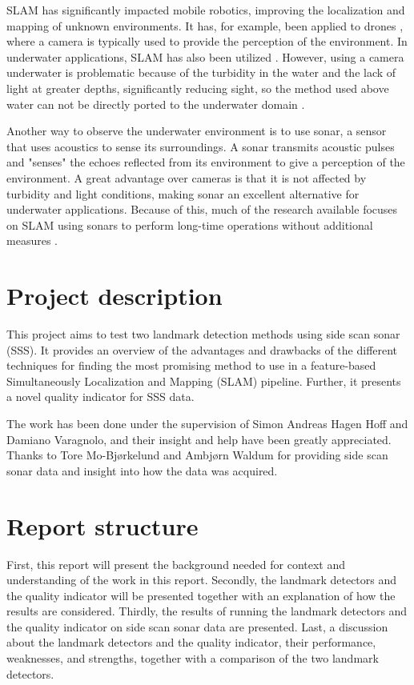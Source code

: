 SLAM has significantly impacted mobile robotics, improving the localization and mapping of unknown environments. It has, for example, been applied to drones \cite{VonStumberg2017FromExploration}, where a camera is typically used to provide the perception of the environment. In underwater applications, SLAM has also been utilized \cite{Hidalgo2015ReviewTechniques}. However, using a camera underwater is problematic because of the turbidity in the water and the lack of light at greater depths, significantly reducing sight, so the method used above water can not be directly ported to the underwater domain \cite{Paull2015Communication-constrainedSLAM}.  

Another way to observe the underwater environment is to use sonar, a sensor that uses acoustics to sense its surroundings. A sonar transmits acoustic pulses and "senses" the echoes reflected from its environment to give a perception of the environment. A great advantage over cameras is that it is not affected by turbidity and light conditions, making sonar an excellent alternative for underwater applications. Because of this, much of the research available focuses on SLAM using sonars to perform long-time operations without additional measures \cite{Hidalgo2015ReviewTechniques}.

\section{Project description}

This project aims to test two landmark detection methods using side scan sonar (SSS). It provides an overview of the advantages and drawbacks of the different techniques for finding the most promising method to use in a feature-based Simultaneously Localization and Mapping (SLAM) pipeline. Further, it presents a novel quality indicator for SSS data.

The work has been done under the supervision of Simon Andreas Hagen Hoff and Damiano Varagnolo, and their insight and help have been greatly appreciated. Thanks to Tore Mo-Bjørkelund and Ambjørn Waldum for providing side scan sonar data and insight into how the data was acquired. 

\section{Report structure}

First, this report will present the background needed for context and understanding of the work in this report. Secondly, the landmark detectors and the quality indicator will be presented together with an explanation of how the results are considered. Thirdly, the results of running the landmark detectors and the quality indicator on side scan sonar data are presented. Last, a discussion about the landmark detectors and the quality indicator, their performance, weaknesses, and strengths, together with a comparison of the two landmark detectors.  


